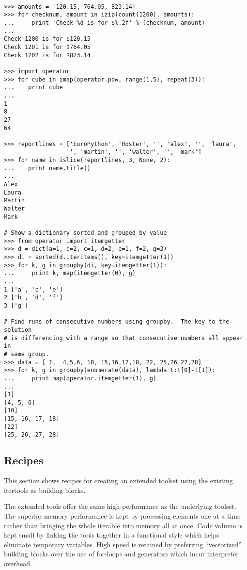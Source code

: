 \begin{verbatim}

>>> amounts = [120.15, 764.05, 823.14]
>>> for checknum, amount in izip(count(1200), amounts):
...     print 'Check %d is for $%.2f' % (checknum, amount)
...
Check 1200 is for $120.15
Check 1201 is for $764.05
Check 1202 is for $823.14

>>> import operator
>>> for cube in imap(operator.pow, range(1,5), repeat(3)):
...    print cube
...
1
8
27
64

>>> reportlines = ['EuroPython', 'Roster', '', 'alex', '', 'laura',
                  '', 'martin', '', 'walter', '', 'mark']
>>> for name in islice(reportlines, 3, None, 2):
...    print name.title()
...
Alex
Laura
Martin
Walter
Mark

# Show a dictionary sorted and grouped by value
>>> from operator import itemgetter
>>> d = dict(a=1, b=2, c=1, d=2, e=1, f=2, g=3)
>>> di = sorted(d.iteritems(), key=itemgetter(1))
>>> for k, g in groupby(di, key=itemgetter(1)):
...     print k, map(itemgetter(0), g)
...
1 ['a', 'c', 'e']
2 ['b', 'd', 'f']
3 ['g']

# Find runs of consecutive numbers using groupby.  The key to the solution
# is differencing with a range so that consecutive numbers all appear in
# same group.
>>> data = [ 1,  4,5,6, 10, 15,16,17,18, 22, 25,26,27,28]
>>> for k, g in groupby(enumerate(data), lambda t:t[0]-t[1]):
...     print map(operator.itemgetter(1), g)
... 
[1]
[4, 5, 6]
[10]
[15, 16, 17, 18]
[22]
[25, 26, 27, 28]

\end{verbatim}


\subsection{Recipes \label{itertools-recipes}}

This section shows recipes for creating an extended toolset using the
existing itertools as building blocks.

The extended tools offer the same high performance as the underlying
toolset.  The superior memory performance is kept by processing elements one
at a time rather than bringing the whole iterable into memory all at once.
Code volume is kept small by linking the tools together in a functional style
which helps eliminate temporary variables.  High speed is retained by
preferring ``vectorized'' building blocks over the use of for-loops and
generators which incur interpreter overhead.


